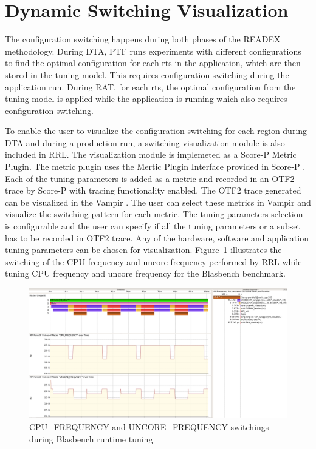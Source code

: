 \section{Dynamic Switching Visualization} \label{switching-visualization}
The configuration switching happens during both phases of the READEX methodology. 
During DTA, PTF runs experiments with different configurations to find the optimal configuration for each rts in the application, which are then stored in the tuning model. 
This requires configuration switching during the application run. 
During RAT, for each rts, the optimal configuration from the tuning model is applied while the application is running which also requires configuration switching.

To enable the user to visualize the configuration switching for each region during DTA and during a production run, a switching visualization module is also included in RRL. 
The visualization module is implemeted as a Score-P Metric Plugin. 
The metric plugin uses the Mertic Plugin Interface provided in Score-P \cite{Schoene2017}. 
Each of the tuning parameters is added as a metric and recorded in an OTF2 \cite{Ilsche-Cstate} trace by Score-P with tracing functionality enabled. 
The OTF2 trace generated can be visualized in the Vampir \cite{BHJR:10:VampirOverview}. 
The user can select these metrics in Vampir and visualize the switching pattern for each metric.
The tuning parameters selection is configurable and the user can specify if all the tuning parameters or a subset has to be recorded in OTF2 trace. 
Any of the hardware, software and application tuning parameters can be chosen for visualization.
Figure~\ref{fig:switch_visualization} illustrates the switching of the CPU frequency and uncore frequency performed by
RRL while tuning CPU frequency and uncore frequency for the Blasbench benchmark.
\begin{figure}[!t]
\centering
\includegraphics[width=.95\columnwidth]{figures/visualization_trace.png}
\caption{{CPU\_FREQUENCY} and {UNCORE\_FREQUENCY} switchings during Blasbench runtime tuning}
\label{fig:switch_visualization}
\end{figure}

 